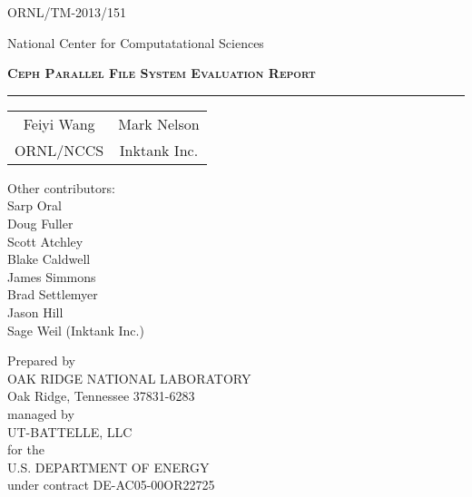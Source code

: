\thispagestyle{empty}

\hfill ORNL/TM-2013/151


\vspace{3em}

\begin{center}
National Center for Computatational Sciences
\end{center}


\vspace{3em}

\begin{center}
\textbf\textsc{\Large Ceph Parallel File System Evaluation Report}\\
\rule{5in}{1pt}%
\end{center}

\vspace{0.5in}

\begin{center}
\begin{tabular}{ c c }
Feiyi Wang  &  Mark Nelson \\ 
ORNL/NCCS & Inktank Inc. \\
\end{tabular}
\end{center}

\vspace{0.25in}

\begin{center}
Other contributors: \\
\vspace{1em}
Sarp Oral\\
Doug Fuller\\
Scott Atchley\\
Blake Caldwell\\
James Simmons\\
Brad Settlemyer\\
Jason Hill\\
Sage Weil (Inktank Inc.)
\end{center}


\vfill

\begin{center}
Prepared by \\
OAK RIDGE NATIONAL LABORATORY\\
Oak Ridge, Tennessee 37831-6283 \\ 
managed by \\
UT-BATTELLE, LLC \\
for the \\
U.S. DEPARTMENT OF ENERGY\\ 
under contract DE-AC05-00OR22725
\end{center}

\pagebreak
